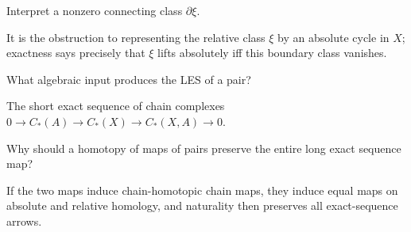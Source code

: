 \begin{problem}\label{prob:viii19-22}
Interpret a nonzero connecting class \(\partial\xi\).
\end{problem}
\begin{solution}
It is the obstruction to representing the relative class \(\xi\) by an absolute cycle in \(X\); exactness says precisely that \(\xi\) lifts absolutely iff this boundary class vanishes.
\end{solution}

\begin{problem}\label{prob:viii19-23}
What algebraic input produces the LES of a pair?
\end{problem}
\begin{solution}
The short exact sequence of chain complexes \(0\to C_*(A)\to C_*(X)\to C_*(X,A)\to0\).
\end{solution}

\begin{problem}\label{prob:viii19-24}
Why should a homotopy of maps of pairs preserve the entire long exact sequence map?
\end{problem}
\begin{solution}
If the two maps induce chain-homotopic chain maps, they induce equal maps on absolute and relative homology, and naturality then preserves all exact-sequence arrows.
\end{solution}
